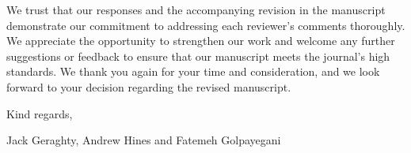 \documentclass{article}
\begin{document}
\vspace{0.25cm}
\hline
\vspace{0.25cm}

\noindent We trust that our responses and the accompanying revision in the manuscript demonstrate our commitment to addressing each reviewer’s comments thoroughly. We appreciate the opportunity to strengthen our work and welcome any further suggestions or feedback to ensure that our manuscript meets the journal's high standards. We thank you again for your time and consideration, and we look forward to your decision regarding the revised manuscript. \newline


\noindent Kind regards,

Jack Geraghty, Andrew Hines and Fatemeh Golpayegani 
\end{document}
